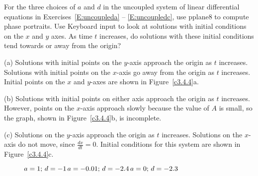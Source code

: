 \documentclass{ximera}
\begin{document}
\CEXER


\begin{exercise} \label{c3.4.4}
For the three choices of $a$ and $d$ in the uncoupled system of
linear differential equations in Exercises~\ref{E:uncoupleda} -- 
\ref{E:uncoupledc}, use {\sf pplane8}
to compute phase portraits.  Use {\sf Keyboard input} to look at
solutions with initial conditions on the $x$ and $y$ axes.  As time
$t$ increases, do solutions with these initial conditions tend towards 
or away from the origin?

\begin{solution}

(a) Solutions with initial points on the $y$-axis approach the
origin as $t$ increases.  Solutions with initial points on the
$x$-axis go away from the origin as $t$ increases.  Initial points
on the $x$ and $y$-axes are shown in Figure~\ref{c3.4.4}a.

(b) Solutions with initial points on either axis approach the
origin as $t$ increases.  However, points on the $x$-axis
approach slowly because the value of $A$ is small, so the \Matlab
graph, shown in Figure~\ref{c3.4.4}b, is incomplete.

(c) Solutions on the $y$-axis approach the origin as $t$
increases.  Solutions on the $x$-axis do not move, since
$\frac{dx}{dt} = 0$.  Initial conditions for this system are shown
in Figure~\ref{c3.4.4}c.

\begin{figure}[htb]
                       \centerline{%
                       }
	\centerline{$a = 1\hbox{; }d = -1$\hspace{0.7in}$a = -0.01\hbox{; }d = -2.4$\hspace{0.7in}$a = 0\hbox{; }d = -2.3$}
\end{figure}

\end{solution}
\end{exercise}
\end{document}
